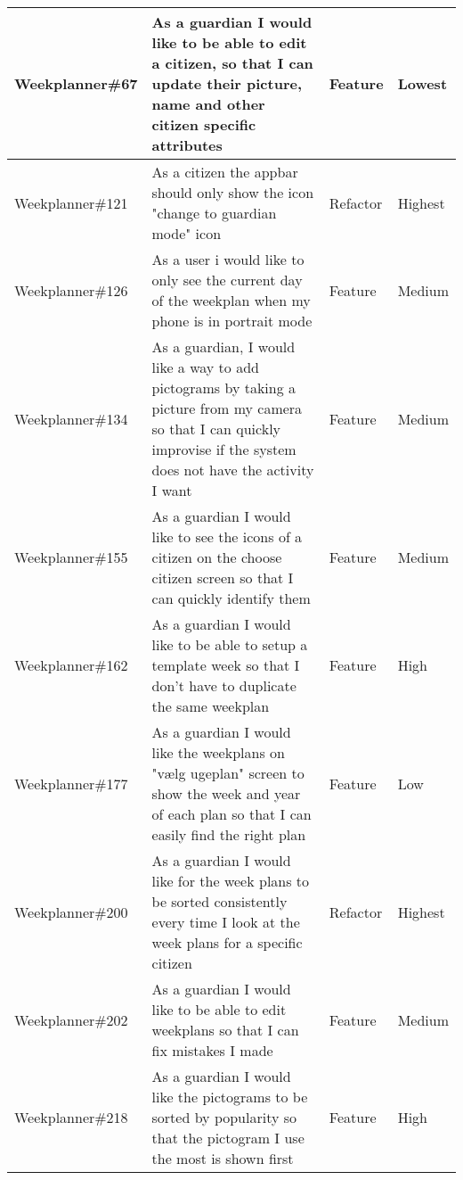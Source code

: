 \begin{longtable}{|p{2.9cm}|p{7cm}|p{1.4cm}|p{1.5cm}|}
    Weekplanner\#67  & As a guardian I would like to be able to edit a citizen, so that I can update their picture, name and other citizen specific attributes                                   & Feature & Lowest   \\ \hline
    Weekplanner\#121 & As a citizen the appbar should only show the icon "change to guardian mode" icon                                                                                          & Refactor & Highest   \\ \hline
    Weekplanner\#126 & As a user i would like to only see the current day of the weekplan when my phone is in portrait mode                                                                      & Feature & Medium   \\ \hline
    Weekplanner\#134 & As a guardian, I would like a way to add pictograms by taking a picture from my camera so that I can quickly improvise if the system does not have the activity I want    & Feature & Medium    \\ \hline
    Weekplanner\#155 & As a guardian I would like to see the icons of a citizen on the choose citizen screen so that I can quickly identify them                                                 & Feature & Medium   \\ \hline
    Weekplanner\#162 & As a guardian I would like to be able to setup a template week so that I don't have to duplicate the same weekplan                                                        & Feature & High  \\ \hline
    Weekplanner\#177 & As a guardian I would like the weekplans on "vælg ugeplan" screen to show the week and year of each plan so that I can easily find the right plan                         & Feature & Low  \\ \hline
    Weekplanner\#200 & As a guardian I would like for the week plans to be sorted consistently every time I look at the week plans for a specific citizen                                        & Refactor & Highest   \\ \hline
    Weekplanner\#202 & As a guardian I would like to be able to edit weekplans so that I can fix mistakes I made                                                                                 & Feature & Medium   \\ \hline
    Weekplanner\#218 & As a guardian I would like the pictograms to be sorted by popularity so that the pictogram I use the most is shown first                                                   & Feature & High   \\ \hline

\end{longtable}
